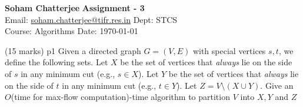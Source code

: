 \documentclass[a4paper, 11pt]{article}
\begin{document}
	
	
	\textsf{\noindent \large\textbf{Soham Chatterjee} \hfill \textbf{Assignment - 3}\\
		Email: \href{soham.chatterjee@tifr.res.in}{soham.chatterjee@tifr.res.in} \hfill Dept: STCS\\
		\normalsize Course: Algorithms \hfill Date: \today}
	
\addtocounter{problem}{1}
\begin{problem}{%
		\hfill  (15 marks)
	}{p1%
}
Given a directed graph $G=(V,E)$ with special vertices $s,t$, we define the following sets. Let $X$ be the set of vertices that \textit{always} lie on the side of $s$ in any minimum cut (e.g., $s\in X$). Let $Y$ be the set of  vertices that \textit{always} lie on the side of $t$ in any minimum cut (e.g., $t\in Y$). Let $Z=V\setminus (X\cup Y)$. Give an $O$(time for max-flow computation)-time algorithm to partition $V$ into $X,Y$ and $Z$
\end{problem}
\end{document}
